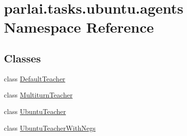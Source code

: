 \hypertarget{namespaceparlai_1_1tasks_1_1ubuntu_1_1agents}{}\section{parlai.\+tasks.\+ubuntu.\+agents Namespace Reference}
\label{namespaceparlai_1_1tasks_1_1ubuntu_1_1agents}
\subsection*{Classes}
\begin{DoxyCompactItemize}
\item 
class \hyperlink{classparlai_1_1tasks_1_1ubuntu_1_1agents_1_1DefaultTeacher}{Default\+Teacher}
\item 
class \hyperlink{classparlai_1_1tasks_1_1ubuntu_1_1agents_1_1MultiturnTeacher}{Multiturn\+Teacher}
\item 
class \hyperlink{classparlai_1_1tasks_1_1ubuntu_1_1agents_1_1UbuntuTeacher}{Ubuntu\+Teacher}
\item 
class \hyperlink{classparlai_1_1tasks_1_1ubuntu_1_1agents_1_1UbuntuTeacherWithNegs}{Ubuntu\+Teacher\+With\+Negs}
\end{DoxyCompactItemize}
